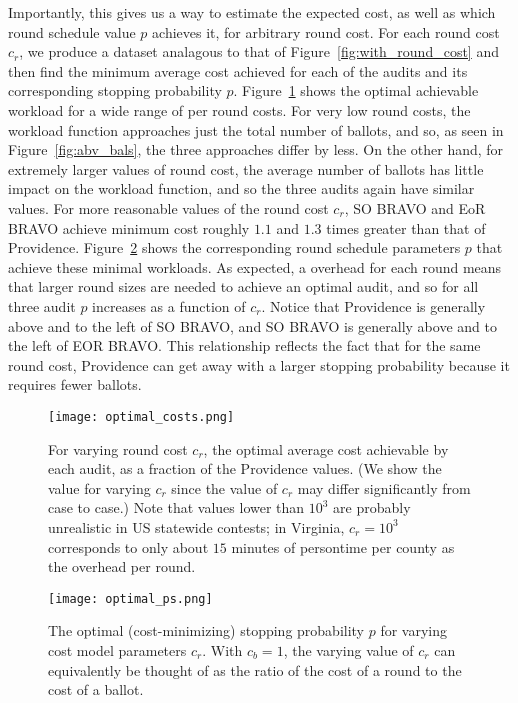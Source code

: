 Importantly, this gives us a way to estimate the expected cost, as well as which round schedule value $p$ achieves it, for arbitrary round cost. For each round cost $c_r$, we produce a dataset analagous to that of Figure~\ref{fig:with_round_cost} and then find the minimum average cost achieved for each of the audits and its corresponding stopping probability $p$. 
Figure~\ref{fig:optimal_costs} shows the optimal achievable workload for a wide range of per round costs. For very low round costs, the workload function approaches just the total number of ballots, and so, as seen in Figure~\ref{fig:abv_bals}, the three approaches differ by less. On the other hand, for extremely larger values of round cost, the average number of ballots has little impact on the workload function, and so the three audits again have similar values. For more reasonable values of the round cost $c_r$, SO BRAVO and EoR BRAVO achieve minimum cost roughly $1.1$ and $1.3$ times greater than that of Providence.
Figure~\ref{fig:optimal_ps} shows the corresponding round schedule parameters $p$ that achieve these minimal workloads. As expected, a overhead for each round means that larger round sizes are needed to achieve an optimal audit, and so for all three audit $p$ increases as a function of $c_r$. Notice that Providence is generally above and to the left of SO BRAVO, and SO BRAVO is generally above and to the left of EOR BRAVO. This relationship reflects the fact that for the same round cost, Providence can get away with a larger stopping probability because it requires fewer ballots.

\begin{figure}
\texttt{[image: optimal\_costs.png]}
\caption{For varying round cost $c_r$, the optimal average cost achievable by each audit, as a fraction of the Providence values. (We show the value for varying $c_r$ since the value of $c_r$ may differ significantly from case to case.) Note that values lower than $10^3$ are probably unrealistic in US statewide contests; in Virginia, $c_r=10^3$ corresponds to only about $15$ minutes of persontime per county as the overhead per round.}
\label{fig:optimal_costs}
\end{figure}

\begin{figure}
\texttt{[image: optimal\_ps.png]}
\caption{The optimal (cost-minimizing) stopping probability $p$ for varying cost model parameters $c_r$. With $c_b=1$, the varying value of $c_r$ can equivalently be thought of as the ratio of the cost of a round to the cost of a ballot.}
\label{fig:optimal_ps}
\end{figure}


